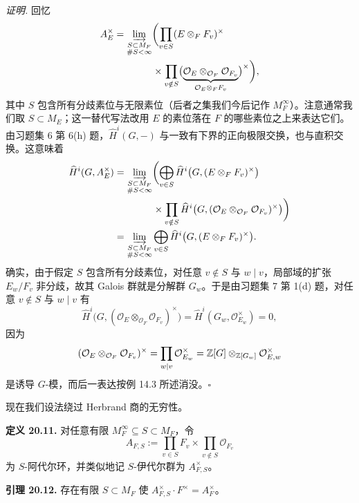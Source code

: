 \textit{证明.} 回忆
\begin{align*}
A_E^\times&=\varinjlim_{\substack{S\subset M_F\\ \#S<\infty}}\biggl(\prod_{v\in S}(E\otimes_F F_v)^\times\\
&\qquad\qquad\times\prod_{v\notin S}\bigl(\underbrace{\mathcal O_E\otimes_{\mathcal O_F}\mathcal O_{F_v}}_{\mathcal O_E\otimes_F F_v}\bigr)^\times\biggr),
\end{align*}
其中 $S$ 包含所有分歧素位与无限素位（后者之集我们今后记作 $M_F^\infty$）。注意通常我们取 $S\subset M_E$；这一替代写法改用 $E$ 的素位落在 $F$ 的哪些素位之上来表达它们。由习题集 6 第 6(h) 题，$\widehat H^i(G,-)$ 与一致有下界的正向极限交换，也与直积交换。这意味着
\begin{align*}
\widehat H^i(G,A_E^\times)
&=\varinjlim_{\substack{S\subset M_F\\ \#S<\infty}}\biggl(\bigoplus_{v\in S}\widehat H^i\bigl(G,(E\otimes_F F_v)^\times\bigr)\\
&\qquad\qquad\times\prod_{v\notin S}\widehat H^i\bigl(G,(\mathcal O_E\otimes_{\mathcal O_F}\mathcal O_{F_v})^\times\bigr)\biggr)\\
&=\varinjlim_{\substack{S\subset M_F\\ \#S<\infty}}\bigoplus_{v\in S}\widehat H^i\bigl(G,(E\otimes_F F_v)^\times\bigr).
\end{align*}
确实，由于假定 $S$ 包含所有分歧素位，对任意 $v\notin S$ 与 $w\mid v$，局部域的扩张 $E_w/F_v$ 非分歧，故其 Galois 群就是分解群 $G_w$。于是由习题集 7 第 1(d) 题，对任意 $v\notin S$ 与 $w\mid v$ 有
\[
\widehat H^i\bigl(G,(\mathcal O_E\otimes_{\mathcal O_F}\mathcal O_{F_v})^\times\bigr)
=\widehat H^i(G_w,\mathcal O_{E_w}^\times)=0,
\]
因为
\[
(\mathcal O_E\otimes_{\mathcal O_F}\mathcal O_{F_v})^\times
=\prod_{w\mid v}\mathcal O_{E_w}^\times
=\mathbb{Z}[G]\otimes_{\mathbb{Z}[G_w]}\mathcal O_{E,w}^\times
\]
是诱导 $G$-模，而后一表达按例 14.3 所述消没。\hfill$\square$

现在我们设法绕过 Herbrand 商的无穷性。

\textbf{定义 20.11.} 对任意有限 $M_F^\infty\subseteq S\subset M_F$，令
\[
A_{F,S}:=\prod_{v\in S}F_v\times\prod_{v\notin S}\mathcal O_{F_v}
\]
为 $S$-阿代尔环，并类似地记 $S$-伊代尔群为 $A_{F,S}^\times$。

\textbf{引理 20.12.} 存在有限 $S\subset M_F$ 使 $A_{F,S}^\times\cdot F^\times=A_F^\times$。

